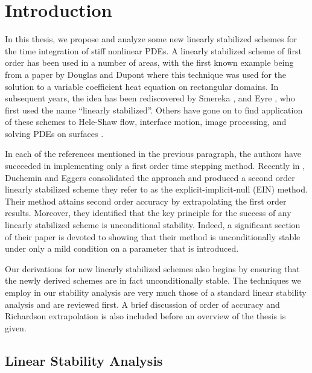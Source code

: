 \chapter{Introduction}
In this thesis, we propose and analyze some new linearly stabilized schemes for the time integration of stiff nonlinear PDEs. A linearly stabilized scheme of first order has been used in a number of areas, with the first known example being from a paper by Douglas and Dupont \cite{douglas1971alternating} where this technique was used for the solution to a variable coefficient heat equation on rectangular domains. In subsequent years, the idea has been rediscovered by Smereka \cite{smereka2003semi}, and  Eyre \cite{eyre1998bunconditionally}, who first used the name ``linearly stabilized''. Others have gone on to find application of these schemes to Hele-Shaw flow, interface motion, image processing, and solving PDEs on surfaces \cite{eyre1998bunconditionally,salac2008local,glasner2002diffuse,schonlieb2011unconditionally,macdonald2009implicit}.

In each of the references mentioned in the previous paragraph, the authors have succeeded in implementing only a first order time stepping method. Recently in \cite{duchemin2014explicit},  Duchemin and Eggers consolidated the approach and produced a second order linearly stabilized scheme they refer to as the explicit-implicit-null (EIN) method. Their method attains second order accuracy by extrapolating the first order results. Moreover, they identified that the key principle for the success of any linearly stabilized scheme is unconditional stability. Indeed, a significant section of their paper is devoted to showing that their method is unconditionally stable under only a mild condition on a parameter that is introduced.

Our derivations for new linearly stabilized schemes also begins by ensuring that the newly derived schemes are in fact unconditionally stable. The techniques we employ in our stability analysis are very much those of a standard linear stability analysis and are reviewed first. A brief discussion of order of accuracy and Richardson extrapolation is also included before an overview of the thesis is given.

\section{Linear Stability Analysis}
